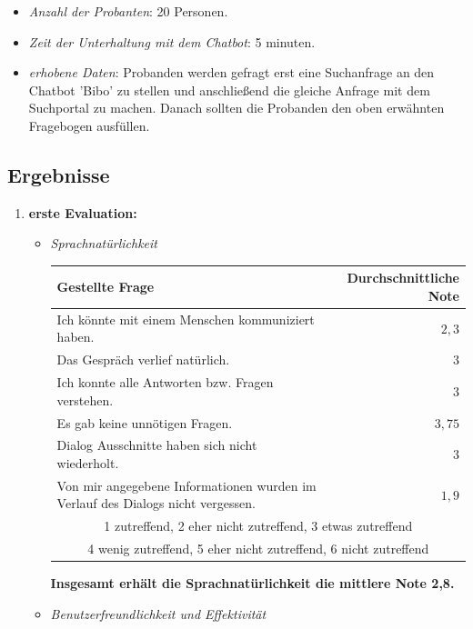 \documentclass[12pt,a4paper]{scrartcl}
\begin{document}
\begin{enumerate}
\begin{itemize}
\item \textit{Anzahl der Probanten}: 20 Personen.
\item \textit{Zeit der Unterhaltung mit dem Chatbot}: 5 minuten.
\item \textit{erhobene Daten}: Probanden werden gefragt erst eine Suchanfrage an den Chatbot 'Bibo' zu stellen und anschließend die gleiche Anfrage mit dem Suchportal zu machen. Danach sollten die Probanden den oben erwähnten Fragebogen ausfüllen.\\ 
\end{itemize}
\end{enumerate}
\subsection{Ergebnisse}
\begin{enumerate}
\item \textbf{erste Evaluation:}
\begin{itemize}
\item \textit{Sprachnatürlichkeit}

\begin{center}
\begin{tabularx}{\linewidth}{|X|r|}
\hline
Gestellte Frage & Durchschnittliche Note  \\ \hline

Ich könnte mit einem Menschen kommuniziert haben. & $2,3$  \\ \hline

Das Gespräch verlief natürlich. & $3$   \\ \hline

Ich konnte alle Antworten bzw. Fragen verstehen. & $3$ \\ \hline

Es gab keine unnötigen Fragen. & $3,75$  \\ \hline


Dialog Ausschnitte haben sich nicht wiederholt. & $3$  \\ \hline

Von mir angegebene Informationen wurden im Verlauf des Dialogs nicht vergessen. & $1,9$  \\ \hline
\multicolumn{2}{|c|}{1 zutreffend, 2 eher nicht zutreffend, 3 etwas zutreffend} \\ \hline
\multicolumn{2}{|c|}{4 wenig zutreffend, 5 eher nicht zutreffend, 6 nicht zutreffend} \\ \hline
\end{tabularx}
\end{center}
\textbf{Insgesamt erhält die Sprachnatürlichkeit die mittlere Note 2,8.}
\item \textit{Benutzerfreundlichkeit und Effektivität}
\begin{center}
\begin{tabularx}{\linewidth}{|X|c|}


\end{tabularx}
\end{center}
\end{itemize}
\end{enumerate}
\end{document}
